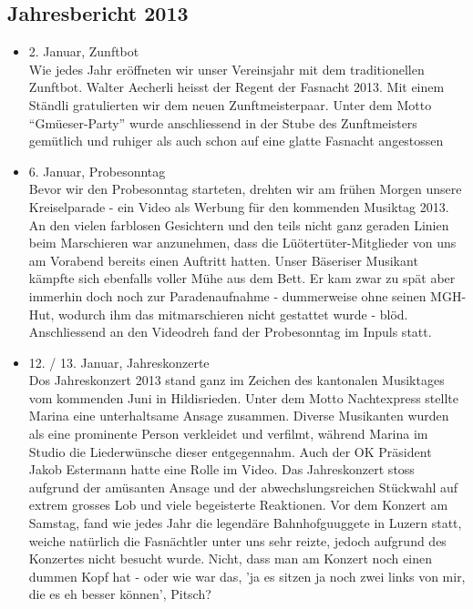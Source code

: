 \subsection{Jahresbericht 2013}
\begin{history}


    \begin{itemize}

        \item[]2. Januar, Zunftbot\\
        Wie jedes Jahr eröffneten wir unser Vereinsjahr mit dem traditionellen
        Zunftbot. Walter Aecherli heisst der Regent der Fasnacht 2013. Mit einem
        Ständli gratulierten wir dem neuen Zunftmeisterpaar. Unter dem Motto
        \enquote{Gmüeser-Party} wurde anschliessend in der Stube des
        Zunftmeisters gemütlich und ruhiger als auch schon auf eine glatte
        Fasnacht angestossen

        \item[]6. Januar, Probesonntag\\
        Bevor wir den Probesonntag starteten, drehten wir am frühen Morgen
        unsere Kreiselparade - ein Video als Werbung für den kommenden Musiktag
        2013. An den vielen farblosen Gesichtern und den teils nicht ganz
        geraden Linien beim Marschieren war anzunehmen, dass die
        Lüötertüter-Mitglieder von uns am Vorabend bereits einen Auftritt
        hatten. Unser Bäseriser Musikant kämpfte sich ebenfalls voller Mühe aus
        dem Bett. Er kam zwar zu spät aber immerhin doch noch zur
        Paradenaufnahme - dummerweise ohne seinen MGH-Hut, wodurch ihm das
        mitmarschieren nicht gestattet wurde - blöd. Anschliessend an den
        Videodreh fand der Probesonntag im Inpuls statt.

        \item[]12. / 13. Januar, Jahreskonzerte\\
        Dos Jahreskonzert 2013 stand ganz im Zeichen des kantonalen Musiktages
        vom kommenden Juni in Hildisrieden. Unter dem Motto Nachtexpress stellte
        Marina eine unterhaltsame Ansage zusammen. Diverse Musikanten wurden als
        eine prominente Person verkleidet und verfilmt, während Marina im Studio
        die Liederwünsche dieser entgegennahm. Auch der OK Präsident Jakob
        Estermann hatte eine Rolle im Video. Das Jahreskonzert stoss aufgrund
        der amüsanten Ansage und der abwechslungsreichen Stückwahl auf extrem
        grosses Lob und viele begeisterte Reaktionen. Vor dem Konzert am
        Samstag, fand wie jedes Jahr die legendäre Bahnhofguuggete in Luzern
        statt, weiche natürlich die Fasnächtler unter uns sehr reizte, jedoch
        aufgrund des Konzertes nicht besucht wurde. Nicht, dass man am Konzert
        noch einen dummen Kopf hat - oder wie war das, 'ja es sitzen ja noch
        zwei links von mir, die es eh besser können’, Pitsch?


\end{itemize}
\end{history}
